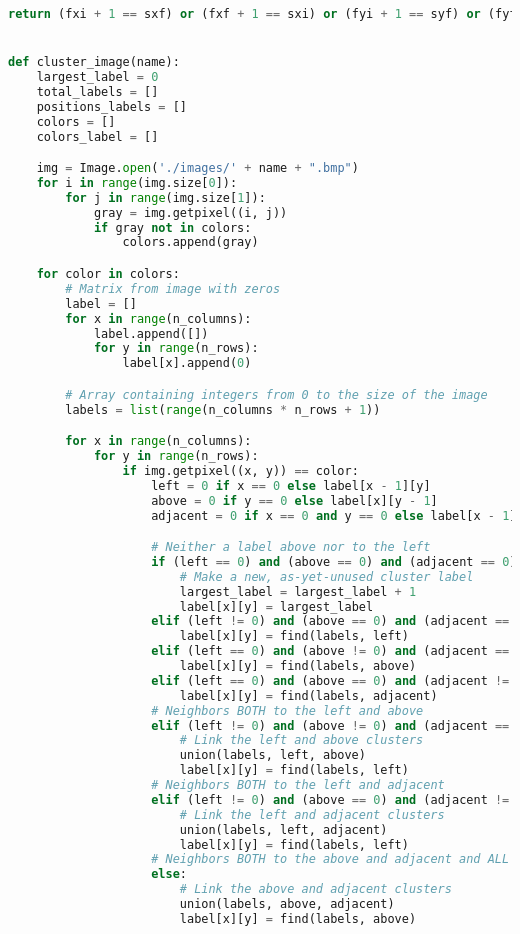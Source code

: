 \documentclass{article}
\begin{document}
\begin{lstlisting}[language=Python]
    return (fxi + 1 == sxf) or (fxf + 1 == sxi) or (fyi + 1 == syf) or (fyf + 1 == syi)


def cluster_image(name):
    largest_label = 0
    total_labels = []
    positions_labels = []
    colors = []
    colors_label = []

    img = Image.open('./images/' + name + ".bmp")
    for i in range(img.size[0]):
        for j in range(img.size[1]):
            gray = img.getpixel((i, j))
            if gray not in colors:
                colors.append(gray)

    for color in colors:
        # Matrix from image with zeros
        label = []
        for x in range(n_columns):
            label.append([])
            for y in range(n_rows):
                label[x].append(0)

        # Array containing integers from 0 to the size of the image
        labels = list(range(n_columns * n_rows + 1))

        for x in range(n_columns):
            for y in range(n_rows):
                if img.getpixel((x, y)) == color:
                    left = 0 if x == 0 else label[x - 1][y]
                    above = 0 if y == 0 else label[x][y - 1]
                    adjacent = 0 if x == 0 and y == 0 else label[x - 1][y - 1]

                    # Neither a label above nor to the left
                    if (left == 0) and (above == 0) and (adjacent == 0):
                        # Make a new, as-yet-unused cluster label
                        largest_label = largest_label + 1
                        label[x][y] = largest_label
                    elif (left != 0) and (above == 0) and (adjacent == 0):  # One neighbor, to the left
                        label[x][y] = find(labels, left)
                    elif (left == 0) and (above != 0) and (adjacent == 0):  # One neighbor, above
                        label[x][y] = find(labels, above)
                    elif (left == 0) and (above == 0) and (adjacent != 0):  # One neighbor, adjacent
                        label[x][y] = find(labels, adjacent)
                    # Neighbors BOTH to the left and above
                    elif (left != 0) and (above != 0) and (adjacent == 0):
                        # Link the left and above clusters
                        union(labels, left, above)
                        label[x][y] = find(labels, left)
                    # Neighbors BOTH to the left and adjacent
                    elif (left != 0) and (above == 0) and (adjacent != 0):
                        # Link the left and adjacent clusters
                        union(labels, left, adjacent)
                        label[x][y] = find(labels, left)
                    # Neighbors BOTH to the above and adjacent and ALL of them
                    else:
                        # Link the above and adjacent clusters
                        union(labels, above, adjacent)
                        label[x][y] = find(labels, above)


\end{lstlisting}
\end{document}
